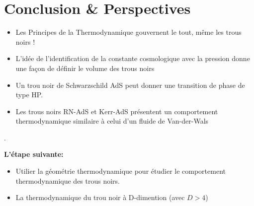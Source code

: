 
\section{Conclusion \& Perspectives}

\begin{frame}{\underline{\secname}}

\begin{itemize}\setlength\itemsep{0.5em}
	\item  Les Principes de la Thermodynamique gouvernent le
tout, même les trous noirs !

 \item L’idée de l’identification de la constante cosmologique avec la pression donne une façon de définir le volume des trous noirs

\item Un trou noir de Schwarzschild AdS peut donner une transition de phase de type HP.

\item Les trous noirs RN-AdS et Kerr-AdS présentent un comportement thermodynamique similaire à celui d’un fluide de Van-der-Wals


\end{itemize}.

\textbf{L'étape suivante:}

\begin{itemize}\setlength\itemsep{0.5em}
	\item Utilier la géométrie thermodynamique pour étudier le comportement thermodynamique des trous noirs.
	\item La thermodynamique du trou noir à D-dimention (avec $D > 4$)
\end{itemize}
\end{frame}